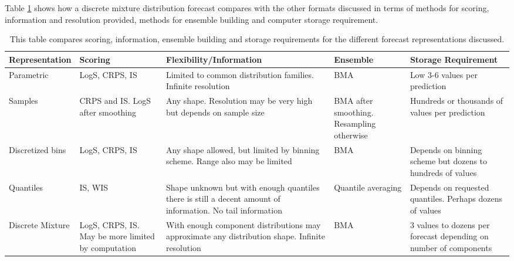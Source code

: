 \documentclass[11pt,notitlepage]{isuthesis}
\begin{document}
Table \ref{table:repscomp} shows how a discrete mixture distribution forecast 
compares with the other formats discussed in terms of methods for scoring,
information and resolution provided, methods for ensemble building and computer
storage requirement.





\begin{flushleft}
  \begin{table}
    \begin{tabular}{ | p{2.4cm} || p{3cm} | p{4cm} | p{3cm} | p{3.5cm} |}
    \hline
    \textbf{Representation} & \textbf{Scoring} & 
    \textbf{Flexibility/Information} & \textbf{Ensemble} &
    \textbf{Storage Requirement}
    \\ \hline \hline

    Parametric & LogS, CRPS, IS & Limited to common distribution families. 
    Infinite resolution
    & BMA & Low 3-6 values per prediction \\ \hline
    
    Samples & CRPS and IS. LogS after smoothing & Any shape. Resolution may be
    very high but depends on sample size & BMA after smoothing. Resampling 
    otherwise & 
    Hundreds or thousands of values per prediction
    \\ \hline
    
    Discretized bins & LogS, CRPS, IS &
    Any shape allowed, but limited by binning scheme. Range also may be limited
    & BMA &
    Depends on binning scheme but dozens to hundreds of values
    \\ \hline


    Quantiles & IS, WIS & Shape unknown but with enough quantiles there is still
    a decent amount of information. No tail information & 
    Quantile averaging & Depends on 
    requested quantiles. Perhaps dozens of values
    \\ \hline
    
    Discrete Mixture & LogS, CRPS, IS. May be more limited by computation & With
    enough component distributions may
    approximate any distribution shape. Infinite resolution& BMA 
    & 3 values to dozens per forecast depending on number of components
    \\ \hline
    
  
   
	 \end{tabular}
   \caption[Forecast representation comparison]{This table compares scoring,
   information, ensemble building and storage requirements for the different
   forecast representations discussed.}
   \label{table:repscomp}
   \end{table}
	 
\end{flushleft}
\end{document}
